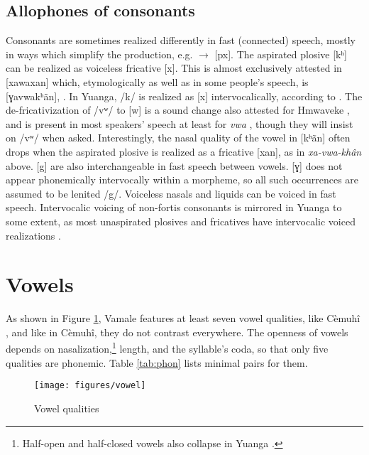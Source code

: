 	\subsection{Allophones of consonants}
	\label{ssec:ConsAlloph}
	Consonants are sometimes realized differently in fast (connected) speech, mostly in ways which simplify the production, e.g.  $\rightarrow$ [px].
	The aspirated plosive [kʰ] can be realized as voiceless fricative [x]. This is almost exclusively attested in [xawaxan] \goodtilde [ɣawaxan]  which, etymologically as well as in some people's speech, is [ɣavwakʰãn],  . In Yuanga, /k/ is realized as [x] intervocalically, according to \textcite[111]{schooling_phonology_1992}. The de-fric\-a\-tiv\-ization of /vʷ/ to [w] is a sound change also attested for Hmwaveke \parencite[120]{campbell_phenomenon_1987}, and is present in most speakers' speech at least for \textit{vwa} , though they will insist on /vʷ/ when asked. Interestingly, the nasal quality of the vowel in [kʰãn]  often drops when the aspirated plosive is realized as a fricative [xan], as in \textit{xa-vwa-khân} above. 
	[g] \goodtilde [ɣ] are also interchangeable in fast speech between vowels. [ɣ] does not appear phonemically intervocally within a morpheme, so all such occurrences are assumed to be lenited /g/.
	Voiceless nasals and liquids can be voiced in fast speech. Intervocalic voicing of non-fortis consonants is mirrored in Yuanga to some extent, as most unaspirated plosives and fricatives have intervocalic voiced realizations \parencite[115]{schooling_phonology_1992}.
 
	
	\section{Vowels}
	\label{sec:V}
As shown in Figure \ref{fig:vowel}, Vamale features at least seven vowel qualities, like Cèmuhî \parencite[29]{rivierre_langue_1980}, and like in Cèmuhî, they do not contrast everywhere. The openness of vowels depends on nasalization,\footnote{Half-open and half-closed vowels also collapse in Yuanga \parencite[103]{schooling_phonology_1992}.} length, and the syllable's coda, so that only five qualities are phonemic. Table \ref{tab:phon} lists minimal pairs for them.\largerpage 


\begin{figure}[H]
	\texttt{[image: figures/vowel]}
	\caption{Vowel qualities}
	\label{fig:vowel}
\end{figure}


